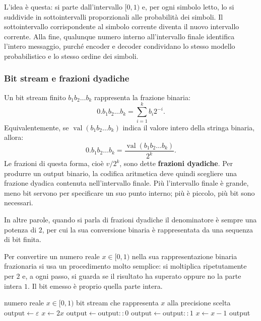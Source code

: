\documentclass{article}
\theoremstyle{definition}
\numberwithin{equation}{section}
\begin{document}
L'idea è questa: si parte dall'intervallo $[0,1)$ e, per ogni simbolo letto, lo si suddivide in sottointervalli proporzionali alle probabilità dei simboli. Il sottointervallo corrispondente al simbolo corrente diventa il nuovo intervallo corrente. Alla fine, qualunque numero interno all'intervallo finale identifica l'intero messaggio, purché encoder e decoder condividano lo stesso modello probabilistico e lo stesso ordine dei simboli.

\subsubsection{Bit stream e frazioni dyadiche}
Un bit stream finito $b_1b_2\ldots b_k$ rappresenta la frazione binaria:
\[
    0.b_1b_2\ldots b_k
    =
    \sum_{i=1}^{k} b_i2^{-i}.
\]
Equivalentemente, se $\operatorname{val}(b_1b_2\ldots b_k)$ indica il valore intero della stringa binaria, allora:
\[
    0.b_1b_2\ldots b_k
    =
    \frac{\operatorname{val}(b_1b_2\ldots b_k)}{2^k}.
\]
Le frazioni di questa forma, cioè $v/2^k$, sono dette \textbf{frazioni dyadiche}. Per produrre un output binario, la codifica aritmetica deve quindi scegliere una frazione dyadica contenuta nell'intervallo finale. Più l'intervallo finale è grande, meno bit servono per specificare un suo punto interno; più è piccolo, più bit sono necessari.

In altre parole, quando si parla di frazioni dyadiche il denominatore è sempre una potenza di $2$, per cui la sua conversione binaria è rappresentata da una sequenza di bit finita.

Per convertire un numero reale $x\in[0,1)$ nella sua rappresentazione binaria frazionaria si usa un procedimento molto semplice: si moltiplica ripetutamente per $2$ e, a ogni passo, si guarda se il risultato ha superato oppure no la parte intera $1$. Il bit emesso è proprio quella parte intera.

\begin{algorithm}[htpb]
    \caption{Conversione di un numero frazionario in binario}
    \label{alg:fractional_binary_converter}
    \begin{algorithmic}[1]
        \Require numero reale $x\in[0,1)$
        \Ensure bit stream che rappresenta $x$ alla precisione scelta
        \State $\text{output} \gets \varepsilon$
        \Repeat
        \State $x \gets 2x$
        \State $\text{output} \gets \text{output}\mathbin{::}0$
        \Else
        \State $\text{output} \gets \text{output}\mathbin{::}1$
        \State $x \gets x-1$
        \EndIf
        \State \Return output
    \end{algorithmic}
\end{algorithm}
\end{document}
